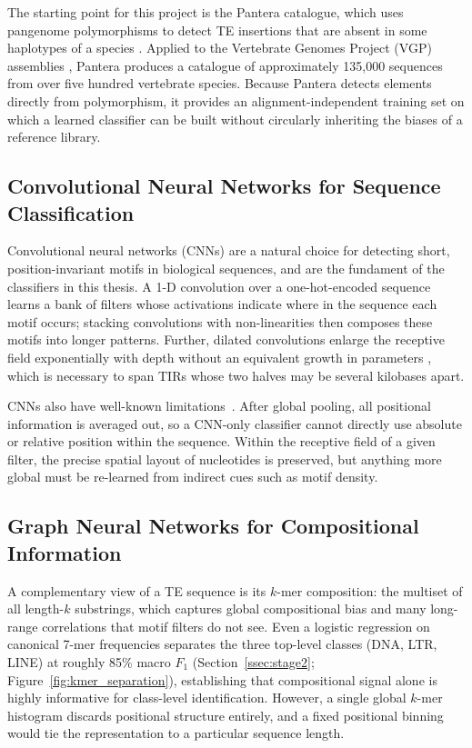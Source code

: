 \documentclass[12pt]{article}
\begin{document}
The starting point for this project is the Pantera catalogue, which uses pangenome polymorphisms to detect TE insertions that are absent in some haplotypes of a species \cite{sierra2024pantera}. Applied to the Vertebrate Genomes Project (VGP) assemblies \cite{rhie2021vgp}, Pantera produces a catalogue of approximately 135{,}000 sequences from over five hundred vertebrate species. Because Pantera detects elements directly from polymorphism, it provides an alignment-independent training set on which a learned classifier can be built without circularly inheriting the biases of a reference library. 

\subsection{Convolutional Neural Networks for Sequence Classification}

Convolutional neural networks (CNNs) \cite{lecun2015deep,krizhevsky2012imagenet,alipanahi2015deepbind} are a natural choice for detecting short, position-invariant motifs in biological sequences, and are the fundament of the classifiers in this thesis. A 1-D convolution over a one-hot-encoded sequence learns a bank of filters whose activations indicate where in the sequence each motif occurs; stacking convolutions with non-linearities then composes these motifs into longer patterns. Further, dilated convolutions enlarge the receptive field exponentially with depth without an equivalent growth in parameters \cite{yu2016dilated}, which is necessary to span TIRs whose two halves may be several kilobases apart.

CNNs also have well-known limitations~\cite{ji2021dnabert}. After global pooling, all positional information is averaged out, so a CNN-only classifier cannot directly use absolute or relative position within the sequence. Within the receptive field of a given filter, the precise spatial layout of nucleotides is preserved, but anything more global must be re-learned from indirect cues such as motif density.

\subsection{Graph Neural Networks for Compositional Information}\label{ssec:gnn_intro}

A complementary view of a TE sequence is its $k$-mer composition: the multiset of all length-$k$ substrings, which captures global compositional bias and many long-range correlations that motif filters do not see. Even a logistic regression on canonical 7-mer frequencies separates the three top-level classes (DNA, LTR, LINE) at roughly 85\% macro $F_1$ (Section~\ref{ssec:stage2}; Figure~\ref{fig:kmer_separation}), establishing that compositional signal alone is highly informative for class-level identification. However, a single global $k$-mer histogram discards positional structure entirely, and a fixed positional binning would tie the representation to a particular sequence length.
\end{document}
